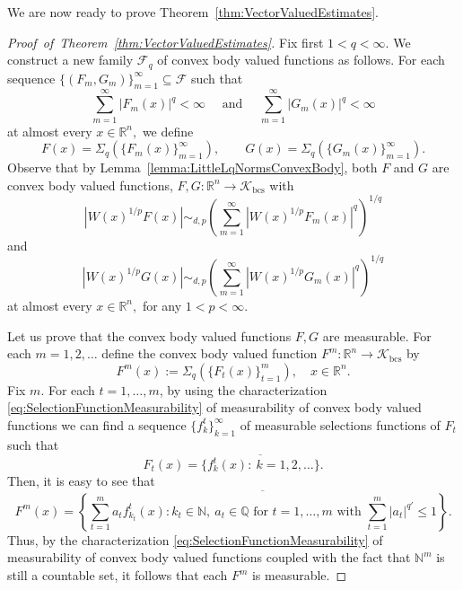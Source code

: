 \documentclass{article}
\theoremstyle{definition}
\theoremstyle{remark}
\numberwithin{equation}{section}
\newcommand{\cF}{\mathcal{F}}
\newcommand{\reals}{\mathbb{R}}
\newcommand{\1}{\mathbf{1}}
\begin{document}
    We are now ready to prove Theorem~\ref{thm:VectorValuedEstimates}.
    \begin{proof}[Proof~of~Theorem~\ref{thm:VectorValuedEstimates}]
        Fix first $1 < q < \infty.$
        We construct a new family $\cF_q$ of convex body valued functions as follows.
        For each sequence $\{(F_m,G_m)\}^{\infty}_{m=1} \subseteq \cF$ such that
        \begin{equation}
            \label{eq:ConvexBodySummability}
            \sum_{m=1}^\infty |F_m(x)|^q < \infty\quad \text{ and }\quad \sum_{m=1}^\infty |G_m(x)|^q < \infty
        \end{equation}
        at almost every $x \in \reals^n,$
        we define
        \begin{equation*}
            F(x) = \Sigma_q (\{F_m(x)\}^{\infty}_{m=1}),\qquad G(x) = \Sigma_q (\{G_m(x)\}^{\infty}_{m=1}).
        \end{equation*}
        Observe that by Lemma~\ref{lemma:LittleLqNormsConvexBody}, both $F$ and $G$ are convex body valued functions, $F,G:\reals^n\to\mathcal{K}_{\mathrm{bcs}}$ with
        \begin{equation*}
            |W(x)^{1/p}F(x)| \sim_{d,p} \left(\sum_{m=1}^\infty |W(x)^{1/p}F_m(x)|^q\right)^{1/q}
        \end{equation*}
        and
        \begin{equation*}
            |W(x)^{1/p}G(x)| \sim_{d,p} \left(\sum_{m=1}^\infty |W(x)^{1/p}G_m(x)|^q\right)^{1/q}
        \end{equation*}
        at almost every $x \in \reals^n,$ for any $1<p<\infty.$
        
        Let us prove that the convex body valued functions $F,G$ are measurable. For each $m=1,2,\ldots$ define the convex body valued function $F^{m}:\reals^n\to\mathcal{K}_{\mathrm{bcs}}$ by
        \begin{equation*}
            F^{m}(x) := \Sigma_{q}(\{F_t(x)\}^{m}_{t=1}),\quad x\in\reals^{n}.
        \end{equation*}
        Fix $m$. For each $t=1,\ldots,m$, by using the characterization \eqref{eq:SelectionFunctionMeasurability} of measurability of convex body valued functions we can find a sequence $\{f_k^{t}\}_{k=1}^{\infty}$ of measurable selections functions of $F_t$ such that
        \begin{equation*}
            F_{t}(x) = \overline{\{f_k^{t}(x):~k=1,2,\ldots\}}.
        \end{equation*}
        Then, it is easy to see that
        \begin{equation*}
            F^{m}(x) = \overline{\left\{\sum_{t=1}^{m}a_t f^t_{k_{t}}(x)\colon k_t\in\mathbb{N},~a_t\in\mathbb{Q}\text{ for } t=1,\ldots,m\text{ with }\sum_{t=1}^{m}|a_t|^{q'}\leq1\right\}}.
        \end{equation*}
        Thus, by the characterization \eqref{eq:SelectionFunctionMeasurability} of measurability of convex body valued functions coupled with the fact that $\mathbb{N}^{m}$ is still a countable set, it follows that each $F^{m}$ is measurable.
        

\end{proof}
\end{document}
